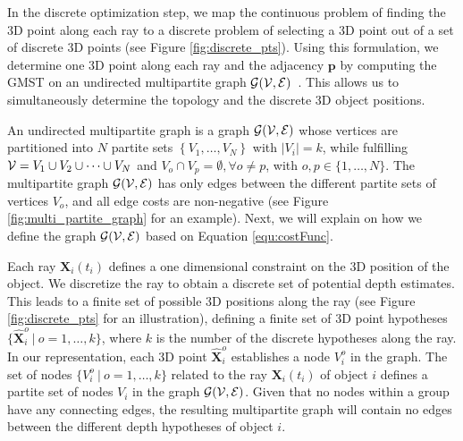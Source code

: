 In the discrete optimization step, we map the continuous problem of finding the 3D point along each ray to a discrete problem of selecting a 3D point out of a set of discrete 3D points (see Figure \ref{fig:discrete_pts}). Using this formulation, we determine one 3D point along each ray and the adjacency $\mathbf{p}$ by computing the GMST on an undirected multipartite graph $\cal{G}(V,E)$~\cite{MyungLT_95}. This allows us to simultaneously  determine the topology and the discrete 3D object positions.

An undirected multipartite graph is a graph $\cal{G}(V,E)$ whose vertices are partitioned into $N$ partite sets $\left\{V_1, \dots, V_N\right\}$ with $\vert V_i \vert = k$, while fulfilling ${\cal V}=V_1 \cup V_2 \cup \dots \cup V_N$ and $V_o \cap V_p = \emptyset, \forall o\neq p$, with $o,p \in \{1, \dots, N \}$. The multipartite graph $\cal{G}(V,E)$ has only edges between the different partite sets of vertices $V_o$, and all edge costs are non-negative (see Figure \ref{fig:multi_partite_graph} for an example). Next, we will explain on how we define the graph $\cal{G}(V,E)$ based on Equation \ref{equ:costFunc}.

Each ray $\mathbf{X}_i(t_i)$ defines a one dimensional constraint on the 3D position of the object. We discretize the ray to obtain a discrete set of potential depth estimates. This leads to a finite set of possible 3D positions along the ray (see Figure \ref{fig:discrete_pts} for an illustration), defining a finite set of 3D point hypotheses 
$\{\mathbf{\hat{X}}_i^o~|~o=1,\dots,k \}$,
where $k$ is the number of the discrete hypotheses along the ray.
In our representation, each 3D point $\mathbf{\hat{X}}_i^o$ establishes a node $V_i^o$ in the graph. The set of nodes $\{V_i^o~|~o=1, \dots, k\}$ related to the ray $\mathbf{X}_i(t_i)$ of object $i$ defines a partite set of nodes $V_i$ in the graph $\cal{G}(V,E)$. 
Given that no nodes within a group have any connecting edges, the resulting multipartite graph will contain no edges between the different depth hypotheses of object $i$.


